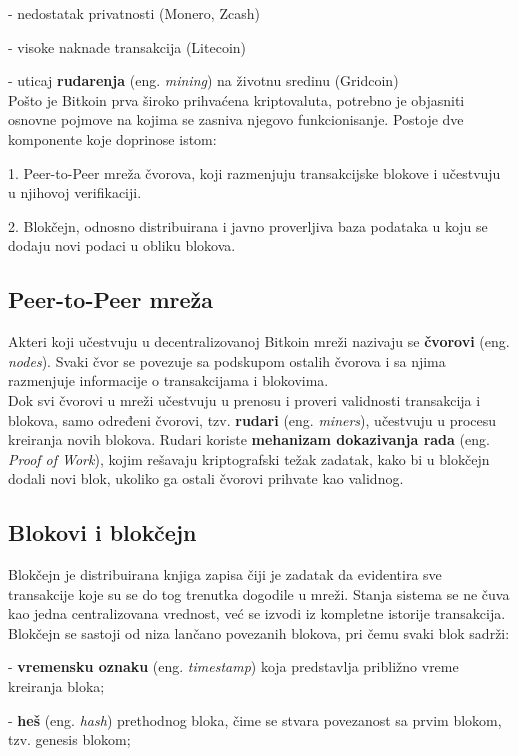 \documentclass[12pt,a4paper]{article}
\begin{document}
-	nedostatak privatnosti (Monero, Zcash)

-	visoke naknade transakcija (Litecoin)

-	uticaj \textbf{rudarenja} (eng. \textit{mining}) na životnu sredinu (Gridcoin)\\

Pošto je Bitkoin prva široko prihvaćena kriptovaluta, potrebno je objasniti osnovne pojmove na kojima se zasniva njegovo funkcionisanje. Postoje dve komponente koje doprinose istom:

    1.	Peer-to-Peer mreža čvorova, koji razmenjuju transakcijske blokove i učestvuju u njihovoj verifikaciji.
    
    2.	Blokčejn, odnosno distribuirana i javno proverljiva baza podataka u koju se dodaju novi podaci u obliku blokova.

\subsection{Peer-to-Peer mreža}
Akteri koji učestvuju u decentralizovanoj Bitkoin mreži nazivaju se \textbf{čvorovi} (eng. \textit{nodes}). Svaki čvor se povezuje sa podskupom ostalih čvorova i sa njima razmenjuje informacije o transakcijama i blokovima.\\
    
Dok svi čvorovi u mreži učestvuju u prenosu i proveri validnosti transakcija i blokova, samo određeni čvorovi, tzv. \textbf{rudari} (eng. \textit{miners}), učestvuju u procesu kreiranja novih blokova.  Rudari koriste \textbf{mehanizam dokazivanja rada} (eng. \textit{Proof of Work}), kojim rešavaju kriptografski težak zadatak, kako bi u blokčejn dodali novi blok, ukoliko ga ostali čvorovi prihvate kao validnog.

\subsection{Blokovi i blokčejn}
Blokčejn je distribuirana knjiga zapisa čiji je zadatak da evidentira sve transakcije koje su se do tog trenutka dogodile u mreži. Stanja sistema se ne čuva kao jedna centralizovana  vrednost, već se izvodi iz kompletne istorije transakcija. Blokčejn se sastoji od niza lančano povezanih blokova, pri čemu svaki blok sadrži:

    -	\textbf{vremensku oznaku} (eng. \textit{timestamp}) koja predstavlja približno vreme kreiranja bloka;
    
    -	\textbf{heš} (eng. \textit{hash}) prethodnog bloka, čime se stvara povezanost sa prvim blokom, tzv. genesis blokom;
    
\end{document}
